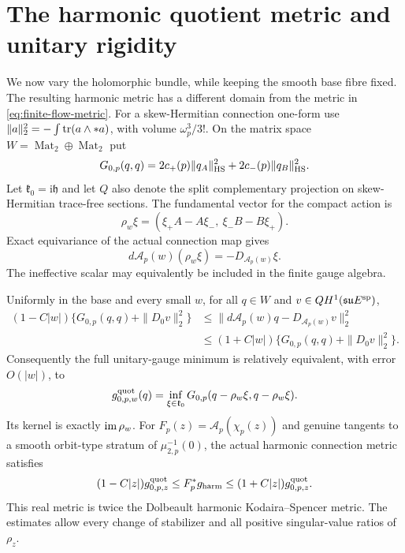 \section{The harmonic quotient metric and unitary rigidity}
\label{sec:harmonic-quotient}

We now vary the holomorphic bundle, while keeping the smooth
base fibre fixed. The resulting harmonic metric has a different
domain from the metric in \eqref{eq:finite-flow-metric}.
For a skew-Hermitian connection one-form use
$\|a\|_2^2=-\int\operatorname{tr}(a\wedge *a)$, with volume $\omega_p^3/3!$.
On the matrix space $W=\operatorname{Mat}_2\oplus\operatorname{Mat}_2$
put
\begin{equation}\label{eq:flat-arrow-metric}
 G_{0,p}(q,q)=2c_+(p)\|q_A\|_{\rm HS}^2
                                  +2c_-(p)\|q_B\|_{\rm HS}^2.
\end{equation}
Let $\mathfrak k_0=\mathrm i\mathfrak h$ and let $Q$ also
denote the split complementary projection on skew-Hermitian
trace-free sections. The fundamental vector for the compact
action is
\[
 \rho_w\xi=(\xi_+A-A\xi_-,\ \xi_-B-B\xi_+).
\]
Exact equivariance of the actual connection map gives
\begin{equation}\label{eq:actual-gauge-action}
       d\mathcal A_p(w)(\rho_w\xi)=-D_{\mathcal A_p(w)}\xi.
\end{equation}
The ineffective scalar may equivalently be included in the
finite gauge algebra.

\begin{theorem}\label{thm:harmonic-quotient}
Uniformly in the base and every small $w$, for all $q\in W$
and $v\in QH^1(\mathfrak{su}E^{\rm sp})$,
\begin{equation}\label{eq:all-gauge-competitors}
 \begin{split}
 (1-C|w|)\{G_{0,p}(q,q)+\|D_0v\|_2^2\}
 &\le\|d\mathcal A_p(w)q-D_{\mathcal A_p(w)}v\|_2^2\\
 &\le(1+C|w|)\{G_{0,p}(q,q)+\|D_0v\|_2^2\}.
 \end{split}
\end{equation}
Consequently the full unitary-gauge minimum is relatively
equivalent, with error $O(|w|)$, to
\begin{equation}\label{eq:finite-quotient-metric}
             g^{\rm quot}_{0,p,w}(q)
                    =\inf_{\xi\in\mathfrak k_0}G_{0,p}(q-\rho_w\xi,q-\rho_w\xi).
\end{equation}
Its kernel is exactly $\operatorname{im}\rho_w$.
For $F_p(z)=\mathcal A_p(\chi_p(z))$ and genuine tangents
to a smooth orbit-type stratum of $\mu_{2,p}^{-1}(0)$,
the actual harmonic connection metric satisfies
\begin{equation}\label{eq:harmonic-relative-metric}
 (1-C|z|)g^{\rm quot}_{0,p,z}
       \le F_p^*g_{\rm harm}\le(1+C|z|)g^{\rm quot}_{0,p,z}.
\end{equation}
This real metric is twice the Dolbeault harmonic
Kodaira--Spencer metric. The estimates allow every change
of stabilizer and all positive singular-value ratios of
$\rho_z$.
\end{theorem}

